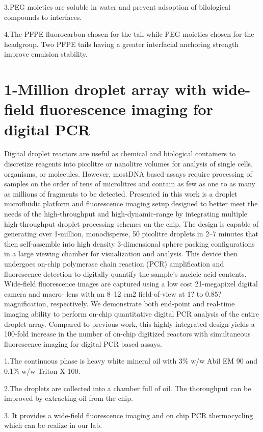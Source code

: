 \documentclass{article}
\begin{document}
3.PEG moieties are soluble in water and prevent adsoption of bilological compounds to interfaces.

4.The PFPE fluorocarbon chosen for the tail while PEG moieties chosen for the headgroup. Two PFPE tails having a greater interfacial anchoring strength improve emulsion stability. 

\part{1-Million droplet array with wide-field fluorescence imaging for digital PCR}

Digital droplet reactors are useful as chemical and biological containers to discretize reagents into picolitre or nanolitre volumes for analysis of single cells, organisms, or molecules. However, mostDNA based assays require processing of samples on the order of tens of microlitres and contain as few as one to as many as millions of fragments to be detected. Presented in this work is a droplet microfluidic platform and fluorescence imaging setup designed to better meet the needs of the high-throughput and high-dynamic-range by integrating multiple high-throughput droplet processing schemes on the chip. The design is capable of generating over 1-million, monodisperse, 50 picolitre droplets in 2–7 minutes that then self-assemble into high density 3-dimensional sphere packing configurations in a large viewing chamber for visualization and analysis. This device then undergoes on-chip polymerase chain reaction (PCR) amplification and fluorescence detection to digitally quantify the sample’s nucleic acid contents. Wide-field fluorescence images are captured using a low cost 21-megapixel digital camera and macro- lens with an 8–12 cm2
field-of-view at 1? to 0.85? magnification, respectively. We demonstrate both
end-point and real-time imaging ability to perform on-chip quantitative digital PCR analysis of the entire droplet array. Compared to previous work, this highly integrated design yields a 100-fold increase in the number of on-chip digitized reactors with simultaneous fluorescence imaging for digital PCR based assays.


1.The continuous phase is heavy white mineral oil with 3\% w/w Abil EM 90 and 0.1\% w/w Triton X-100.

2.The droplets are collected into a chamber full of oil. 
The thoroughput can be improved by extracting oil from the chip.

3. It provides a wide-field fluorescence imaging and on chip PCR thermocycling which can be realize in our lab.
\end{document}
